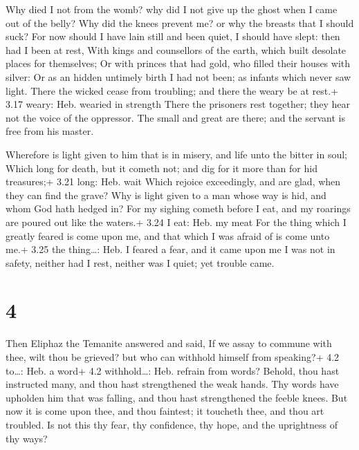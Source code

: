  Why died I not from the womb? why did I not give up the
ghost when I came out of the belly?  Why did the knees
prevent me? or why the breasts that I should suck?  For now
should I have lain still and been quiet, I should have slept: then had I
been at rest,  With kings and counsellors of the earth,
which built desolate places for themselves;  Or with
princes that had gold, who filled their houses with silver:
 Or as an hidden untimely birth I had not been; as infants
which never saw light.  There the wicked cease from
troubling; and there the weary be at rest.+ 3.17 weary: Heb. wearied in
strength  There the prisoners rest together; they hear not
the voice of the oppressor.  The small and great are there;
and the servant is free from his master.

 Wherefore is light given to him that is in misery, and
life unto the bitter in soul;  Which long for death, but it
cometh not; and dig for it more than for hid treasures;+ 3.21 long: Heb.
wait  Which rejoice exceedingly, and are glad, when they
can find the grave?  Why is light given to a man whose way
is hid, and whom God hath hedged in?  For my sighing cometh
before I eat, and my roarings are poured out like the waters.+ 3.24 I
eat: Heb. my meat  For the thing which I greatly feared is
come upon me, and that which I was afraid of is come unto me.+ 3.25 the
thing\ldots: Heb. I feared a fear, and it came upon me  I
was not in safety, neither had I rest, neither was I quiet; yet trouble
came.

\hypertarget{section-3}{%
\section{4}\label{section-3}}

 Then Eliphaz the Temanite answered and said, 
If we assay to commune with thee, wilt thou be grieved? but who can
withhold himself from speaking?+ 4.2 to\ldots: Heb. a word+ 4.2
withhold\ldots: Heb. refrain from words?  Behold, thou hast
instructed many, and thou hast strengthened the weak hands. 
Thy words have upholden him that was falling, and thou hast strengthened
the feeble knees.  But now it is come upon thee, and thou
faintest; it toucheth thee, and thou art troubled.  Is not
this thy fear, thy confidence, thy hope, and the uprightness of thy
ways?

